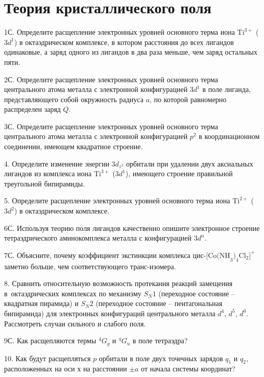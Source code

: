 \setmainfont{Noto Serif}
\setsansfont{Noto Sans}
\setmonofont{Noto Sans Mono}

\section{Теория кристаллического поля}
1С. Определите расщепление электронных уровней основного терма иона $\text{Ti}^{3+}$ ($3d^1$) в октаэдрическом комплексе, в котором расстояния до всех лигандов одинаковые, а заряд одного из лигандов в два раза меньше, чем заряд остальных пяти.
\par
2С. Определите расщепление электронных уровней основного терма центрального атома металла с электронной конфигурацией $3d^1$ в поле лиганда, представляющего собой окружность радиуса $a$, по которой равномерно распределен заряд $Q$.
\par
3С. Определите расщепление электронных уровней основного терма центрального атома металла с электронной конфигурацией $p^2$ в координационном соединении, имеющем квадратное строение.
\par
4. Определите изменение энергии $3d_{z^2}$ орбитали при удалении двух аксиальных лигандов из комплекса иона $\text{Ti}^{3+}$ ($3d^1$), имеющего строение правильной треугольной бипирамиды.
\par
5. Определите расщепление электронных уровней основного терма иона $\text{Ti}^{2+}$ ($3d^2$) в октаэдрическом комплексе.
\par
6С. Используя теорию поля лигандов качественно опишите электронное строение тетраэдрического аминокомплекса металла с конфигурацией $3d^n$.
\par
7С. Объясните, почему коэффициент экстинкции комплекса цис-$\text{[Co(NH}_3)_4\text{Cl}_2]^+$ заметно больше, чем соответствующего транс-изомера.
\par
8. Сравнить относительную возможность протекания реакций замещения в~октаэдрических комплексах по механизму $S_{N}1$ (переходное состояние – квадратная пирамида) и $S_{N}2$ (переходное состояние – пентагональная бипирамида) для электронных конфигураций центрального металла $d^4$, $d^5$, $d^6$. Рассмотреть случаи сильного и слабого поля.
\par
9С. Как расщепляются термы $^4G_g$ и $^4G_u$ в поле тетраэдра?
\par
10. Как будут расщепляться $p$ орбитали в поле двух точечных зарядов $q_1$ и $q_2$, расположенных на оси $х$ на расстоянии $\pm a$ от начала системы координат?
\par
